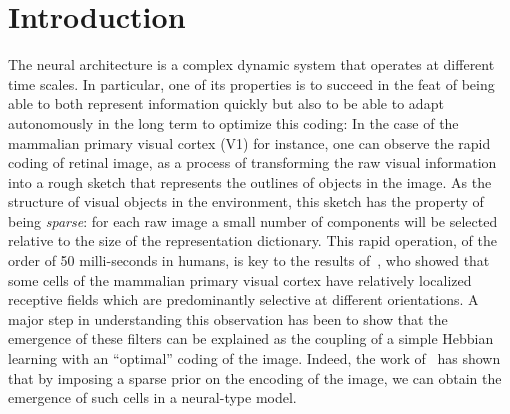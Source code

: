 \documentclass[a4paper, 11pt, draft]{article} %
\title{\Title}
\author{%
\FirstNameA\ \AuthorA \and \FirstNameB\ \AuthorB \and \FirstNameC\ \AuthorC
}
\date{\Institute\ \\ 
\Organism\
}
\newcommand{\Abstract}{
The formation of structure in the brain, that is, of the connection between cells within neural populations, is by large an unsupervised learning process: The emergence of this architecture is mostly self-organized. In the primary visual cortex of mammals, for example, one may observe during development the emergence of cells selective to localized, oriented features. This leads to the development of a rough representation of contours of the retinal image in area V1. A major difficulty in defining unsupervised learning algorithms is that during this process, on the one hand the coding is performed knowing an immature structure and on the other hand, the adaptation of this structure is carried out knowing a code that is not yet optimal. We propose here a fast algorithm compatible with a neuromimetic architecture which solves this problem and allows for the emergence of localized filters sensitive to orientation. The key to this algorithm lies in an adaptive mechanism of homeostasis that reconciles the antagonistic processes that occur at the coding and learning time scales. We tested this unsupervised algorithm with this homeostasis rule for a range of existing unsupervised learning algorithms coupled with different neural coding algorithms. In addition, we propose a simplification of this optimal homeostasis rule by implementing a simple heuristic on the probability of activation of neurones. Compared to the optimal homeostasis rule, we show that this heuristic allows to implement an even faster unsupervised learning algorithm while keeping a large part of its effectiveness. These results demonstrate the potential application of such a strategy to the fast classification of images, for example in hierarchical and dynamic architectures.
}
\begin{document}
%
\maketitle
\begin{abstract}
\Abstract
\end{abstract}
\thispagestyle{empty}
\section{Introduction}\label{introduction}
The neural architecture is a complex dynamic system that operates at different time scales. In particular, one of its properties is to succeed in the feat of being able to both represent information quickly but also to be able to adapt autonomously in the long term to optimize this coding: In the case of the mammalian primary visual cortex (V1) for instance, one can observe the rapid coding of retinal image, as a process of transforming the raw visual information into a rough sketch that represents the outlines of objects in the image. As the structure of visual objects in the environment, this sketch has the property of being \emph{sparse}: for each raw image a small number of components will be selected relative to the size of the representation dictionary. This rapid operation, of the order of 50 milli-seconds in humans, is key to the results of~\citet{Hubel68}, who showed that some cells of the mammalian primary visual cortex have relatively localized receptive fields which are predominantly selective at different orientations. A major step in understanding this observation has been to show that the emergence of these filters can be explained as the coupling of a simple Hebbian learning with an ``optimal'' coding of the image. Indeed, the work of~\citet{Olshausen96} has shown that by imposing a sparse prior on the encoding of the image, we can obtain the emergence of such cells in a neural-type model. %
\end{document}
